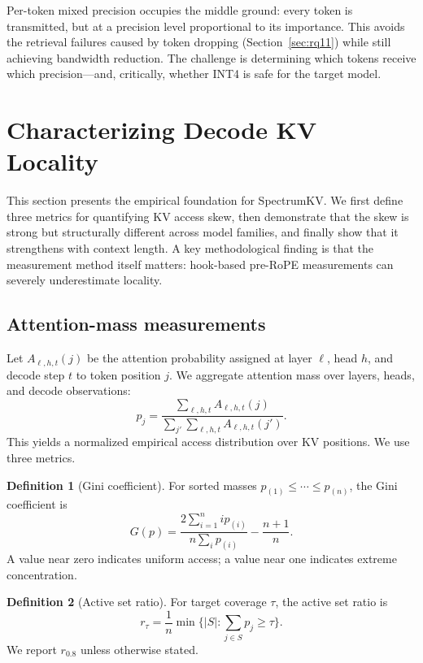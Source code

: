 \documentclass[11pt]{article}
\newcommand{\method}{SpectrumKV}
\theoremstyle{definition}
\newtheorem{definition}{Definition}
\theoremstyle{plain}
\begin{document}
Per-token mixed precision occupies the middle ground: every token is transmitted, but at a precision level proportional to its importance.  This avoids the retrieval failures caused by token dropping (Section~\ref{sec:rq11}) while still achieving bandwidth reduction.  The challenge is determining which tokens receive which precision---and, critically, whether INT4 is safe for the target model.

\section{Characterizing Decode KV Locality}
\label{sec:characterization}

This section presents the empirical foundation for \method{}.  We first define three metrics for quantifying KV access skew, then demonstrate that the skew is strong but structurally different across model families, and finally show that it strengthens with context length.  A key methodological finding is that the measurement method itself matters: hook-based pre-RoPE measurements can severely underestimate locality.

\subsection{Attention-mass measurements}
Let $A_{\ell,h,t}(j)$ be the attention probability assigned at layer $\ell$, head $h$, and decode step $t$ to token position $j$.  We aggregate attention mass over layers, heads, and decode observations:
\begin{equation}
  p_j = \frac{\sum_{\ell,h,t} A_{\ell,h,t}(j)}{\sum_{j'}\sum_{\ell,h,t} A_{\ell,h,t}(j')}.
\end{equation}
This yields a normalized empirical access distribution over KV positions.  We use three metrics.

\begin{definition}[Gini coefficient]
For sorted masses $p_{(1)} \le \cdots \le p_{(n)}$, the Gini coefficient is
\begin{equation}
G(p)=\frac{2\sum_{i=1}^{n} i p_{(i)}}{n\sum_i p_{(i)}}-\frac{n+1}{n}.
\end{equation}
A value near zero indicates uniform access; a value near one indicates extreme concentration.
\end{definition}

\begin{definition}[Active set ratio]
For target coverage $\tau$, the active set ratio is
\begin{equation}
  r_\tau = \frac{1}{n}\min\{|S|: \sum_{j\in S}p_j \ge \tau\}.
\end{equation}
We report $r_{0.8}$ unless otherwise stated.
\end{definition}
\end{document}
